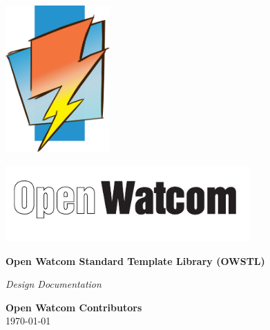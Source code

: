\documentclass[11pt]{report}
\begin{document}
\begin{titlepage}
  \centering
  \vspace*{2cm}

  \includegraphics[width=0.3\textwidth]{ow-logo.pdf}

  \vspace{1cm}

  \includegraphics[width=0.7\textwidth]{ow-text.pdf}

  \vspace{2cm}

  {\Large\bfseries Open Watcom Standard Template Library (OWSTL)}

  \vspace{1cm}

  \textit{Design Documentation}

  \vfill

  \textbf{Open Watcom Contributors} \\
  \today
\end{titlepage}


\tableofcontents
\clearpage

\setcounter{page}{1}







%
%
%
\end{document}
